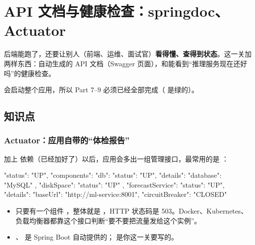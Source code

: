 \chapter{API 文档与健康检查：springdoc、Actuator}

后端能跑了，还要让别人（前端、运维、面试官）\textbf{看得懂、查得到状态}。这一关加两样东西：自动生成的 API 文档（Swagger 页面），和能看到“推理服务现在还好吗”的健康检查。


\begin{note}
 会启动整个应用，所以 Part 7--9 必须已经全部完成（ 是绿的）。
\end{note}

\section{知识点}

\subsection{Actuator：应用自带的“体检报告”}

加上  依赖（已经加好了）以后，应用会多出一组管理接口，最常用的是 ：

\begin{jsoncode}
{
  "status": "UP",
  "components": {
    "db":              { "status": "UP", "details": { "database": "MySQL" } },
    "diskSpace":       { "status": "UP" },
    "forecastService": { "status": "UP", "details": { "baseUrl": "http://ml-service:8001",
                                                      "circuitBreaker": "CLOSED" } }
  }
}
\end{jsoncode}

\begin{itemize}
  \item 只要有一个组件 ，整体就是 ，HTTP 状态码是 503。Docker、Kubernetes、负载均衡器都靠这个接口判断“要不要把流量发给这个实例”。
  \item {}、 是 Spring Boot 自动提供的； 是你这一关要写的。
\end{itemize}

